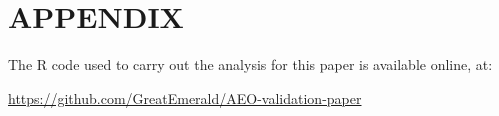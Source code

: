 \documentclass{isprs}
\begin{document}
{%
	\begin{spacing}{0.9}%
		
	\end{spacing}
}

\section*{APPENDIX}\label{APPENDIX}

The R code used to carry out the analysis for this paper is available online, at:

\url{https://github.com/GreatEmerald/AEO-validation-paper}
\end{document}
